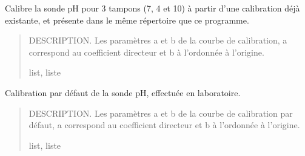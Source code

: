 \documentclass[letterpaper,10pt,french]{sphinxmanual}
\begin{document}

\begin{fulllineitems}
\label{\detokenize{library:lib_pH.Calibration_existante}}
\pysigstartsignatures
\pysiglinewithargsret
{}
{}
{}
\pysigstopsignatures
\sphinxAtStartPar
Calibre la sonde pH pour 3 tampons (7, 4 et 10) à partir d’une calibration déjà existante, et présente dans le même répertoire que ce programme.
\begin{quote}\begin{description}
\sphinxAtStartPar
{} \textendash{} DESCRIPTION. Les paramètres a et b de la courbe de calibration, a correspond au coefficient directeur et b à l’ordonnée à l’origine.

\sphinxAtStartPar
list, liste

\end{description}\end{quote}

\end{fulllineitems}


\begin{fulllineitems}
\label{\detokenize{library:lib_pH.default_Calibration}}
\pysigstartsignatures
\pysiglinewithargsret
{}
{}
{}
\pysigstopsignatures
\sphinxAtStartPar
Calibration par défaut de la sonde pH, effectuée en laboratoire.
\begin{quote}\begin{description}
\sphinxAtStartPar
{} \textendash{} DESCRIPTION. Les paramètres a et b de la courbe de calibration par défaut, a correspond au coefficient directeur et b à l’ordonnée à l’origine.

\sphinxAtStartPar
list, liste

\end{description}\end{quote}

\end{fulllineitems}
\end{document}
